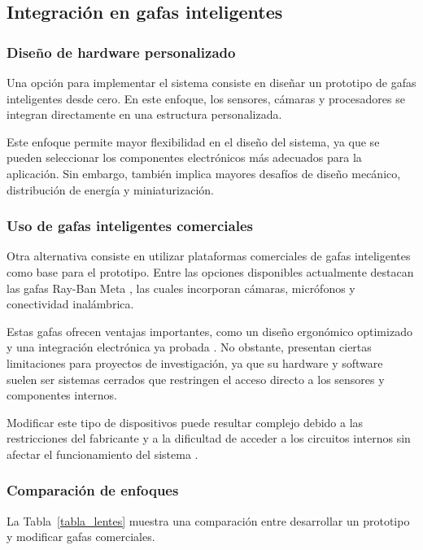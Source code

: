 \subsection{Integración en gafas inteligentes}

\subsubsection{Diseño de hardware personalizado}

Una opción para implementar el sistema consiste en diseñar un prototipo de gafas inteligentes desde cero. En este enfoque, los sensores, cámaras y procesadores se integran directamente en una estructura personalizada.

Este enfoque permite mayor flexibilidad en el diseño del sistema, ya que se pueden seleccionar los componentes electrónicos más adecuados para la aplicación. Sin embargo, también implica mayores desafíos de diseño mecánico, distribución de energía y miniaturización.

\subsubsection{Uso de gafas inteligentes comerciales}

Otra alternativa consiste en utilizar plataformas comerciales de gafas inteligentes como base para el prototipo. Entre las opciones disponibles actualmente destacan las gafas Ray-Ban Meta \cite{raybanmeta_official}, las cuales incorporan cámaras, micrófonos y conectividad inalámbrica.

Estas gafas ofrecen ventajas importantes, como un diseño ergonómico optimizado y una integración electrónica ya probada \cite{raybanmeta_official}. No obstante, presentan ciertas limitaciones para proyectos de investigación, ya que su hardware y software suelen ser sistemas cerrados que restringen el acceso directo a los sensores y componentes internos.

Modificar este tipo de dispositivos puede resultar complejo debido a las restricciones del fabricante y a la dificultad de acceder a los circuitos internos sin afectar el funcionamiento del sistema \cite{raybanmeta_official}.

\subsubsection{Comparación de enfoques}

La Tabla~\ref{tabla_lentes} muestra una comparación entre desarrollar un prototipo y modificar gafas comerciales.

